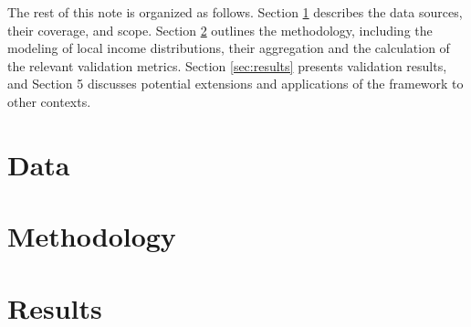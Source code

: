 \documentclass[letterpaper,11pt,leqno]{article}
\begin{document}
The rest of this note is organized as follows. Section \ref{sec:data} describes the data sources, their coverage, and scope. Section \ref{sec:method} outlines the methodology, including the modeling of local income distributions, their aggregation and the calculation of the relevant validation metrics. Section \ref{sec:results} presents validation results, and Section 5 discusses potential extensions and applications of the framework to other contexts.

\section{Data}\label{sec:data}



\section{Methodology}\label{sec:method}



\section{Results}



\newpage
\singlespacing


\end{document}
